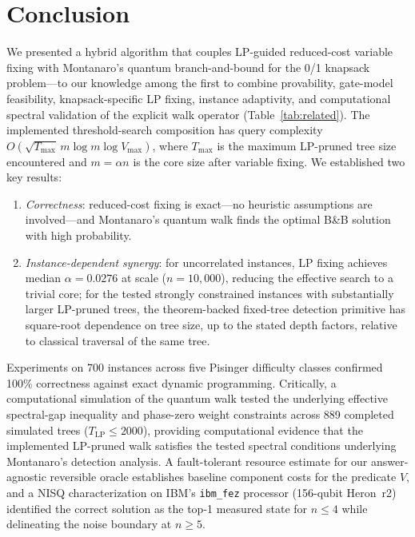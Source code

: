 \documentclass[conference]{IEEEtran} \IEEEoverridecommandlockouts
\begin{document}
\section{Conclusion}

We presented a hybrid algorithm that couples LP-guided reduced-cost variable fixing with Montanaro's quantum branch-and-bound for the 0/1 knapsack problem---to our knowledge among the first to combine provability, gate-model feasibility, knapsack-specific LP fixing, instance adaptivity, and computational spectral validation of the explicit walk operator (Table~\ref{tab:related}). The implemented threshold-search composition has query complexity $O\!\left(\sqrt{T_{\max}}\,m\log m\log V_{\max}\right)$, where $T_{\max}$ is the maximum LP-pruned tree size encountered and $m = \alpha n$ is the core size after variable fixing. We established two key results:

\begin{enumerate}     \item \textit{Correctness}: reduced-cost fixing is exact---no heuristic assumptions are involved---and Montanaro's quantum walk finds the optimal B\&B solution with high probability.     \item \textit{Instance-dependent synergy}: for uncorrelated instances, LP fixing achieves median $\alpha = 0.0276$ at scale ($n = 10{,}000$), reducing the effective search to a trivial core; for the tested strongly constrained instances with substantially larger LP-pruned trees, the theorem-backed fixed-tree detection primitive has square-root dependence on tree size, up to the stated depth factors, relative to classical traversal of the same tree.     \end{enumerate}

Experiments on 700 instances across five Pisinger difficulty classes confirmed 100\% correctness against exact dynamic programming. Critically, a computational simulation of the quantum walk tested the underlying effective spectral-gap inequality and phase-zero weight constraints across 889 completed simulated trees ($T_{\text{LP}} \le 2000$), providing computational evidence that the implemented LP-pruned walk satisfies the tested spectral conditions underlying Montanaro's detection analysis. A fault-tolerant resource estimate for our answer-agnostic reversible oracle establishes baseline component costs for the predicate $V$, and a NISQ characterization on IBM's \texttt{ibm\_fez} processor (156-qubit Heron~r2) identified the correct solution as the top-1 measured state for $n \leq 4$ while delineating the noise boundary at $n \geq 5$.
\end{document}
